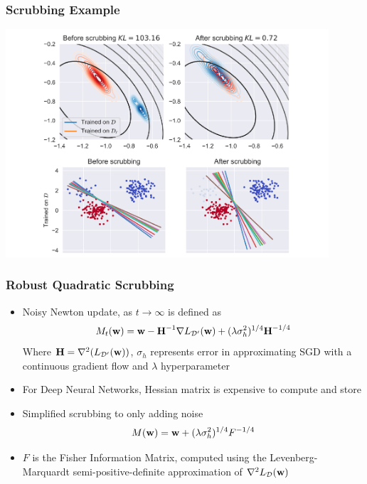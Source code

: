 \documentclass[pdf]{beamer}
\begin{document}
\begin{frame}
  \frametitle{Scrubbing Example }
  \begin{center}
  \includegraphics[width=0.9\textwidth]{images/scrubbing.pdf}
  \end{center}

\end{frame}
\begin{frame}
  \frametitle{Robust Quadratic Scrubbing}
  \begin{itemize}
    \item Noisy Newton update, as $t\rightarrow\infty$ is defined as 
    \[
      M_{t}(\textbf{w}) = \textbf{w} - \textbf{H}^{-1}\nabla L_{\mathcal{D}^{\prime}}(\textbf{w}) + (\lambda\sigma^{2}_{h})^{1/4}\textbf{H}^{-1/4}
    \]
    Where $\textbf{H} = \nabla^{2}(L_{\mathcal{D}^{\prime}}(\textbf{w}))$, $\sigma_{h}$ represents error in approximating SGD with a continuous gradient flow and $\lambda$ hyperparameter
    \item For Deep Neural Networks, Hessian matrix is expensive to compute and store
    \item Simplified scrubbing to only adding noise 
    \[
      M(\textbf{w}) = \textbf{w} + (\lambda\sigma^{2}_{h})^{1/4}F^{-1/4}
    \]
    \item $F$ is the Fisher Information Matrix, computed using the Levenberg- Marquardt semi-positive-definite approximation of $\nabla^{2}L_{\mathcal{D}}(\textbf{w})$
  \end{itemize}
  
\end{frame}
\end{document}
